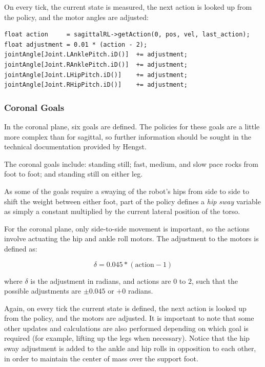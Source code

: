 On every tick, the current state is measured, the next action is looked up from the policy, and the motor angles are adjusted:

\begin{lstlisting}
float action     = sagittalRL->getAction(0, pos, vel, last_action);
float adjustment = 0.01 * (action - 2);
jointAngle[Joint.LAnklePitch.iD()]  += adjustment;
jointAngle[Joint.RAnklePitch.iD()]  += adjustment;
jointAngle[Joint.LHipPitch.iD()]    += adjustment;
jointAngle[Joint.RHipPitch.iD()]    += adjustment;
\end{lstlisting}

\subsubsection{Coronal Goals}
\label{sec:coronal}

In the coronal plane, six goals are defined. The policies for these goals are a little more complex than for sagittal, so further information should be sought in the technical documentation provided by Hengst.\cite{coronal}

The coronal goals include: standing still; fast, medium, and slow pace rocks from foot to foot; and standing still on either leg.

As some of the goals require a swaying of the robot's hips from side to side to shift the weight between either foot, part of the policy defines a \textit{hip sway} variable as simply a constant multiplied by the current lateral position of the torso.

For the coronal plane, only side-to-side movement is important, so the actions involve actuating the hip and ankle roll motors. The adjustment to the motors is defined as:

\begin{equation} \label{eq:coronal}
\delta = 0.045 * (\text{action} - 1)
\end{equation}

where $\delta$ is the adjustment in radians, and actions are $0$ to $2$, such that the possible adjustments are $\pm0.045$ or $+0$ radians.

Again, on every tick the current state is defined, the next action is looked up from the policy, and the motors are adjusted. It is important to note that some other updates and calculations are also performed depending on which goal is required (for example, lifting up the legs when necessary). Notice that the hip sway adjustment is added to the ankle and hip rolls in opposition to each other, in order to maintain the center of mass over the support foot.

